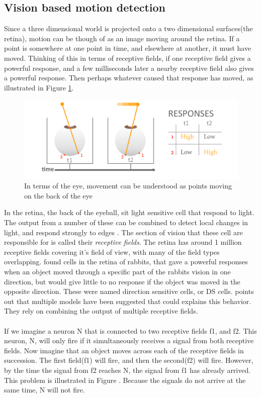 \documentclass[11pt,a4paper,oneside,table,xcdraw]{article}
\begin{document}
\subsection{Vision based motion detection}

Since a three dimensional world is projected onto a two dimensional surfaces(the retina), motion can be though of as an image moving around the retina. If a point is somewhere at one point in time, and elsewhere at another, it must have moved. Thinking of this in terms of receptive fields, if one receptive field gives a powerful response, and a few milliseconds later a nearby receptive field also gives a powerful response. Then perhaps whatever caused that response has moved, as illustrated in Figure \ref{fig:overtime}.
\begin{figure}[H]
		\centering
		\includegraphics[width=1\linewidth]{figure/overtime.png}
		\caption{In terms of the eye, movement can be understood as points moving on the back of the eye}
		\label{fig:overtime}
\end{figure}
In the retina, the back of the eyeball, sit light sensitive cell that respond to light. The output from a number of these can be combined to detect local changes in light, and respond strongly to edges \cite[p. 53]{coursebook}. The section of vision that these cell are responsible for is called their \textit{receptive fields}. The retina has around 1 million receptive fields covering it's field of view, with many of the field types overlapping\cite[p. 64-65]{coursebook}. \cite{Barlow1965} found cells in the retina of rabbits, that gave a powerful responses when an object moved through a specific part of the rabbits vision in one direction, but would give little to no response if the object was moved in the opposite direction. These were named direction sensitive cells, or DS cells. \citet{review} points out that multiple models have been suggested that could explains this behavior. They rely on combining the output of multiple receptive fields.\\\\
If we imagine a neuron N that is connected to two receptive fields f1, and f2. This neuron, N, will only fire if it simultaneously receives a signal from both receptive fields. Now imagine that an object moves across each of the receptive fields in succession. The first field(f1) will fire, and then the second(f2) will fire. However, by the time the signal from f2 reaches N, the signal from f1 has already arrived. This problem is illustrated in Figure . Because the signals do not arrive at the same time, N will not fire.\\\\
\end{document}
